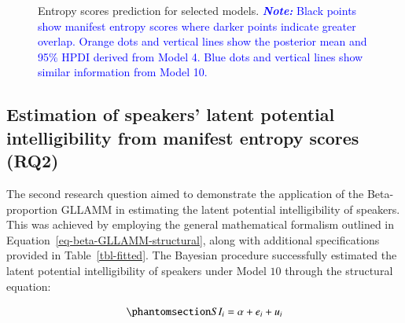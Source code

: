 \documentclass[
  authoryear,
  preprint,
  1p]{elsarticle}
\begin{document}
\label{cell-fig-rq1-pred-speaker}
\begin{figure}[H]


\caption{\label{fig-rq1-pred-speaker}Entropy scores prediction for
selected models. \textcolor{blue}{\textbf{\emph{Note:}} Black points show manifest
entropy scores where darker points indicate greater overlap. Orange dots
and vertical lines show the posterior mean and 95\% HPDI derived from
Model 4. Blue dots and vertical lines show similar information from
Model 10.}}

\end{figure}%

\subsection{Estimation of speakers' latent potential intelligibility
from manifest entropy scores (RQ2)}\label{sec-R-RQ2}

The second research question aimed to demonstrate the application of the
Beta-proportion GLLAMM in estimating the latent potential
intelligibility of speakers. This was achieved by employing the general
mathematical formalism outlined in
Equation~\ref{eq-beta-GLLAMM-structural}, along with additional
specifications provided in Table~\ref{tbl-fitted}. The Bayesian
procedure successfully estimated the latent potential intelligibility of
speakers under Model \(10\) through the structural equation:

\begin{equation}\phantomsection\label{eq-beta-GLLAMM-structural-model10}{
SI_{i} = \alpha + e_{i} + u_{i}
}\end{equation}
\end{document}
